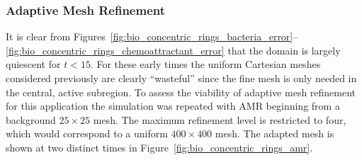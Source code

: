 \subsubsection{Adaptive Mesh Refinement}
It is clear from Figures~\ref{fig:bio_concentric_rings_bacteria_error}--\ref{fig:bio_concentric_rings_chemoattractant_error} that the domain is largely quiescent for $t<15$.  For these early times the uniform Cartesian meshes considered previously are clearly ``wasteful'' since the fine mesh is only needed in the central, active subregion.  To assess the viability of adaptive mesh refinement for this application the simulation was repeated with AMR beginning from a background $25\times 25$ mesh.  The maximum refinement level is restricted to four, which would correspond to a uniform $400 \times 400$ mesh.  The adapted mesh is shown at two distinct times in Figure~\ref{fig:bio_concentric_rings_amr}.
